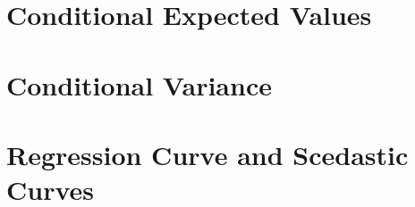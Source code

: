 \section{Conditional Expected Values}

\section{Conditional Variance}

\section{Regression Curve and Scedastic Curves}

